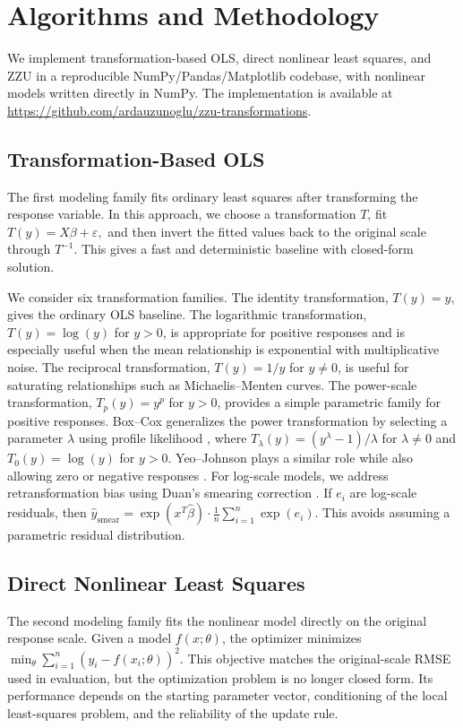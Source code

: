 \documentclass[11pt]{article}
\begin{document}
\section{Algorithms and Methodology}
We implement transformation-based OLS, direct nonlinear least squares, and ZZU in a reproducible NumPy/Pandas/Matplotlib codebase, with nonlinear models written directly in NumPy. The implementation is available at \url{https://github.com/ardauzunoglu/zzu-transformations}.

\subsection{Transformation-Based OLS}
\label{subsec_lin}
The first modeling family fits ordinary least squares after transforming the response variable. In this approach, we choose a transformation \(T\), fit $T(y) = X\beta + \varepsilon,$
and then invert the fitted values back to the original scale through $T^{-1}$. This gives a fast and deterministic baseline with closed-form solution.

We consider six transformation families. The identity transformation, $T(y)=y$, gives the ordinary OLS baseline. The logarithmic transformation, $T(y)=\log(y)$ for $y>0$, is appropriate for positive responses and is especially useful when the mean relationship is exponential with multiplicative noise. The reciprocal transformation, $T(y)=1/y$ for $y\neq 0$, is useful for saturating relationships such as Michaelis--Menten curves. The power-scale transformation, $T_p(y)=y^p$ for $y>0$, provides a simple parametric family for positive responses. Box--Cox generalizes the power transformation by selecting a parameter $\lambda$ using profile likelihood \cite{BoxCox1964}, where $T_\lambda(y)=(y^\lambda-1)/\lambda$ for $\lambda\neq 0$ and $T_0(y)=\log(y)$ for $y>0$. Yeo--Johnson plays a similar role while also allowing zero or negative responses \cite{YeoJohnson2000}.
For log-scale models, we address retransformation bias using Duan's smearing correction \cite{Duan1983}. If \(e_i\) are log-scale residuals, then $\widehat{y}_{\text{smear}}
=
\exp(x^T\widehat{\beta})
\cdot
\frac{1}{n}\sum_{i=1}^{n}\exp(e_i).$
This avoids assuming a parametric residual distribution.

\subsection{Direct Nonlinear Least Squares}
The second modeling family fits the nonlinear model directly on the original response scale. Given a model \(f(x;\theta)\), the optimizer minimizes $\min_{\theta}
    \sum_{i=1}^{n}
    \left(y_i - f(x_i;\theta)\right)^2.$
This objective matches the original-scale RMSE used in evaluation, but the optimization problem is no longer closed form. Its performance depends on the starting parameter vector, conditioning of the local least-squares problem, and the reliability of the update rule.
\end{document}
